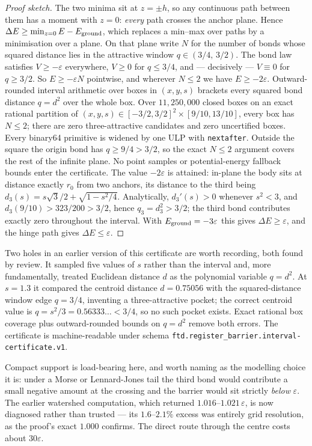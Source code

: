\documentclass[11pt,a4paper]{article}
\theoremstyle{definition}
\theoremstyle{plain}
\theoremstyle{remark}
\begin{document}
\begin{proof}[Proof sketch]
The two minima sit at $z=\pm h$, so any continuous path between them has
a moment with $z=0$: \emph{every} path crosses the anchor plane. Hence
$\Delta E \ge \min_{z=0}E - E_{\rm ground}$, which replaces a min--max
over paths by a minimisation over a plane. On that plane write $N$ for
the number of bonds whose squared distance lies in the attractive window
$q\in(3/4,\,3/2)$. The bond
law satisfies $V\ge-\varepsilon$ everywhere, $V\ge0$ for $q\le3/4$, and
--- decisively --- $V\equiv0$ for $q\ge3/2$. So $E\ge-\varepsilon N$
pointwise, and wherever $N\le2$ we have $E\ge-2\varepsilon$. Outward-rounded
interval arithmetic over boxes in $(x,y,s)$ brackets every squared bond
distance $q=d^2$ over the whole box. Over
$11{,}250{,}000$ closed boxes on an exact rational partition of
$(x,y,s)\in[-3/2,3/2]^2\times[9/10,13/10]$, every box has $N\le2$;
there are zero three-attractive candidates and zero uncertified boxes.
Every binary64 primitive is widened by one ULP with
\texttt{nextafter}. Outside the square the origin bond has
$q\ge9/4>3/2$, so the exact $N\le2$ argument covers the rest of the
infinite plane. No point samples or potential-energy fallback bounds enter
the certificate. The value
$-2\varepsilon$ is attained: in-plane the
body sits at distance exactly $r_0$ from two anchors, its distance to the
third being $d_3(s)=s\sqrt3/2+\sqrt{1-s^2/4}$. Analytically,
$d_3'(s)>0$ whenever $s^2<3$, and
$d_3(9/10)>323/200>3/2$, hence $q_3=d_3^2>3/2$; the third bond contributes exactly zero
throughout the interval. With $E_{\rm ground}=-3\varepsilon$ this gives
$\Delta E\ge\varepsilon$, and the hinge path gives
$\Delta E\le\varepsilon$.
\end{proof}

Two holes in an earlier version of this certificate are worth recording,
both found by review. It sampled five values of $s$ rather than the
interval and, more fundamentally, treated Euclidean distance $d$ as the
polynomial variable $q=d^2$. At $s=1.3$ it compared the centroid distance
$d=0.75056$ with the squared-distance window edge $q=3/4$, inventing a
three-attractive pocket; the correct centroid value is
$q=s^2/3=0.56333\ldots<3/4$, so no such pocket exists. Exact rational box
coverage plus outward-rounded bounds on $q=d^2$ remove both errors. The
certificate is machine-readable under schema
\texttt{ftd.register\_barrier.interval-certificate.v1}.

Compact support is load-bearing here, and worth naming as the modelling
choice it is: under a Morse or Lennard-Jones tail the third bond would
contribute a small negative amount at the crossing and the barrier would
sit strictly \emph{below} $\varepsilon$. The earlier watershed
computation, which returned $1.016$--$1.021\,\varepsilon$, is now
diagnosed rather than trusted --- its $1.6$--$2.1\%$ excess was entirely
grid resolution, as the proof's exact $1.000$ confirms. The direct route
through the centre costs about $30\varepsilon$.
\end{document}
